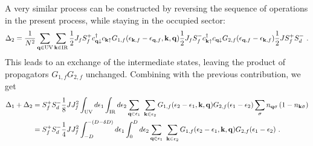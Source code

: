 \documentclass[%
reprint,
superscriptaddress,
groupedaddress,
superscriptaddress,
onecolumn,
10pt
]{revtex4-2}
\begin{document}
A very similar process can be constructed by reversing the sequence of operations in the present process, while staying in the occupied sector:
\begin{equation}\begin{aligned}
	\Delta_{2} = \frac{1}{N^2}\sum_{{\bf q} \in \text{UV}}\sum_{{\bf k} \in \text{IR}}\frac{1}{2}J_fS_f^+ c^\dagger_{{\bf q}\downarrow}c_{{\bf k}\uparrow}  G_{1,f}(\epsilon_{{\bf k},f} - \epsilon_{{\bf q},f}, {\bf k}, {\bf q}) \frac{1}{2}J_f S_f^- c^\dagger_{{\bf k}\uparrow}c_{{\bf q}\downarrow} G_{2,f}(\epsilon_{{\bf q},f} - \epsilon_{{\bf k},f}) \frac{1}{2}J S_f^+ S_d^- ~.
\end{aligned}\end{equation}
This leads to an exchange of the intermediate states, leaving the product of propagators \(G_{1,f} G_{2,f}\) unchanged. Combining with the previous contribution, we get
\begin{equation}\begin{aligned}
	\Delta_{1}  + \Delta_2 &= S_f^+ S_d^- \frac{1}{8}J J_f^2 \int_\text{UV} d\epsilon_1 \int_\text{IR} d\epsilon_2 \sum_{{\bf q} \in \epsilon_1}~\sum_{{\bf k} \in \epsilon_2}G_{1,f}(\epsilon_2 - \epsilon_1, {\bf k}, {\bf q}) G_{2,f}(\epsilon_1 - \epsilon_2) \sum_\sigma n_{{\bf q}\sigma}\left(1 - n_{{\bf k}\bar\sigma}\right)\\
						   &= S_f^+ S_d^- \frac{1}{4}J J_f^2 \int_{-D}^{-(D - \delta D)} d\epsilon_1 \int_0^D d\epsilon_2 \sum_{{\bf q} \in \epsilon_1}~\sum_{{\bf k} \in \epsilon_2}G_{1,f}(\epsilon_2 - \epsilon_1, {\bf k}, {\bf q}) G_{2,f}(\epsilon_1 - \epsilon_2)~.
\end{aligned}\end{equation}
\end{document}
